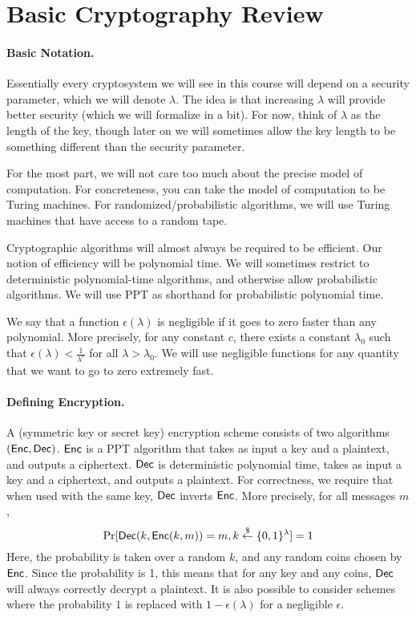 




\section{Basic Cryptography Review}

\paragraph{Basic Notation.} Essentially every cryptosystem we will see in this course will depend on a security parameter, which we will denote $\lambda$.  The idea is that increasing $\lambda$ will provide better security (which we will formalize in a bit).  For now, think of $\lambda$ as the length of the key, though later on we will sometimes allow the key length to be something different than the security parameter.

For the most part, we will not care too much about the precise model of computation.  For concreteness, you can take the model of computation to be Turing machines.  For randomized/probabilistic algorithms, we will use Turing machines that have access to a random tape.  

Cryptographic algorithms will almost always be required to be efficient.  Our notion of efficiency will be polynomial time.  We will sometimes restrict to deterministic polynomial-time algorithms, and otherwise allow probabilistic algorithms.  We will use PPT as shorthand for probabilistic polynomial time.

We say that a function $\epsilon(\lambda)$ is negligible if it goes to zero faster than any polynomial.  More precisely, for any constant $c$, there exists a constant $\lambda_0$ such that $\epsilon(\lambda)<\frac{1}{\lambda^c}$ for all $\lambda>\lambda_0$. We will use negligible functions for any quantity that we want to go to zero extremely fast.

\paragraph{Defining Encryption.} A (symmetric key or secret key) encryption scheme consists of two algorithms $({\sf Enc},{\sf Dec})$.  ${\sf Enc}$ is a PPT algorithm that takes as input a key and a plaintext, and outputs a ciphertext.  ${\sf Dec}$ is deterministic polynomial time, takes as input a key and a ciphertext, and outputs a plaintext.  For correctness, we require that when used with the same key, ${\sf Dec}$ inverts ${\sf Enc}$.  More precisely, for all messages $m$,
\[\Pr[{\sf Dec}(k,{\sf Enc}(k,m))=m,k\stackrel{\$}{\gets}\{0,1\}^\lambda]=1\]
Here, the probability is taken over a random $k$, and any random coins chosen by ${\sf Enc}$.  Since the probability is 1, this means that for any key and any coins, ${\sf Dec}$ will always correctly decrypt a plaintext.  It is also possible to consider schemes where the probability $1$ is replaced with $1-\epsilon(\lambda)$ for a negligible $\epsilon$.


